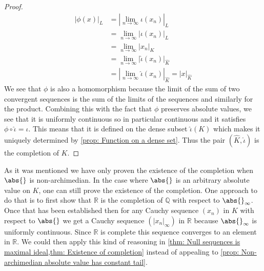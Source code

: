 \documentclass{article}
\newtheorem{remark}{Remark}[section]
\newcommand{\mbb}[1]{\mathbb{#1}}
\numberwithin{equation}{section}
\begin{document}
\begin{proof}
	\begin{align*}
    	|\phi(x)|_{L} & = |\lim_{n \to \infty} \iota(x_n)|_{L}                      	\\
                  	& = \lim_{n \to \infty} |\iota(x_n)|_{L}                      	\\
                  	& = \lim_{n \to \infty} |x_n|_{K}                             	\\
                  	& = \lim_{n \to \infty} |\hat \iota(x_n)|_{\hat K}            	\\
                  	& = |\lim_{n \to \infty} \hat \iota(x_n)|_{\hat K} = |x|_{\hat K}
	\end{align*}
	We see that $\phi$ is also a homomorphism because the limit of the sum of two convergent sequences is the sum of the limits of the sequences and similarly for the product. Combining this with the fact that $\phi$ preserves absolute values, we see that it is uniformly continuous so in particular continuous and it satisfies $\phi \circ \hat \iota = \iota$. This means that it is defined on the dense subset $\hat \iota(K)$ which makes it uniquely determined by \cref{prop: Function on a dense set}. Thus the pair $(\hat K, \hat \iota)$ is the completion of $K$.
\end{proof}
As it was mentioned we have only proven the existence of the completion when $\abs{}$ is non-archimedian. In the case where $\abs{}$ is an arbitrary absolute value on $K$, one can still prove the existence of the completion. One approach to do that is to first show that $\mbb R$ is the completion of $\mbb Q$ with respect to $\abs{}_\infty$. Once that has been established then for any Cauchy sequence $(x_n)$ in $K$ with respect to $\abs{}$ we get a Cauchy sequence $(|x_n|_\infty)$ in $\mbb R$ because $\abs{}_\infty$ is uniformly continuous. Since $\mbb R$ is complete this sequence converges to an element in $\mbb R$. We could then apply this kind of reasoning in \cref{thm: Null sequences is maximal ideal,thm: Existence of completion} instead of appealing to \cref{prop: Non-archimedian absolute value has constant tail}.
\end{document}
